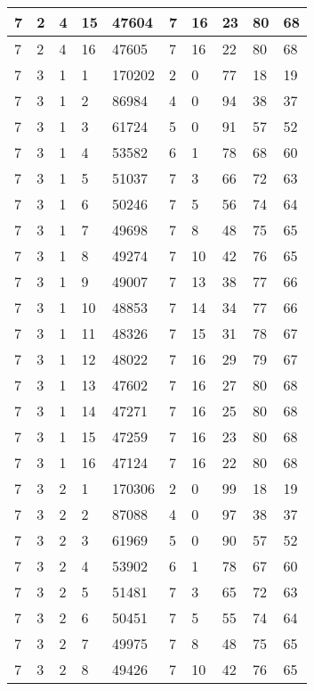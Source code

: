 \begin{table}[!ht]
\begin{tabular}{|l|l|l|l|l|l|l|l|l|l|}
        7 & 2 & 4 & 15 & 47604 & 7 & 16 & 23 & 80 & 68 \\ \hline
        7 & 2 & 4 & 16 & 47605 & 7 & 16 & 22 & 80 & 68 \\ \hline
        7 & 3 & 1 & 1 & 170202 & 2 & 0 & 77 & 18 & 19 \\ \hline
        7 & 3 & 1 & 2 & 86984 & 4 & 0 & 94 & 38 & 37 \\ \hline
        7 & 3 & 1 & 3 & 61724 & 5 & 0 & 91 & 57 & 52 \\ \hline
        7 & 3 & 1 & 4 & 53582 & 6 & 1 & 78 & 68 & 60 \\ \hline
        7 & 3 & 1 & 5 & 51037 & 7 & 3 & 66 & 72 & 63 \\ \hline
        7 & 3 & 1 & 6 & 50246 & 7 & 5 & 56 & 74 & 64 \\ \hline
        7 & 3 & 1 & 7 & 49698 & 7 & 8 & 48 & 75 & 65 \\ \hline
        7 & 3 & 1 & 8 & 49274 & 7 & 10 & 42 & 76 & 65 \\ \hline
        7 & 3 & 1 & 9 & 49007 & 7 & 13 & 38 & 77 & 66 \\ \hline
        7 & 3 & 1 & 10 & 48853 & 7 & 14 & 34 & 77 & 66 \\ \hline
        7 & 3 & 1 & 11 & 48326 & 7 & 15 & 31 & 78 & 67 \\ \hline
        7 & 3 & 1 & 12 & 48022 & 7 & 16 & 29 & 79 & 67 \\ \hline
        7 & 3 & 1 & 13 & 47602 & 7 & 16 & 27 & 80 & 68 \\ \hline
        7 & 3 & 1 & 14 & 47271 & 7 & 16 & 25 & 80 & 68 \\ \hline
        7 & 3 & 1 & 15 & 47259 & 7 & 16 & 23 & 80 & 68 \\ \hline
        7 & 3 & 1 & 16 & 47124 & 7 & 16 & 22 & 80 & 68 \\ \hline
        7 & 3 & 2 & 1 & 170306 & 2 & 0 & 99 & 18 & 19 \\ \hline
        7 & 3 & 2 & 2 & 87088 & 4 & 0 & 97 & 38 & 37 \\ \hline
        7 & 3 & 2 & 3 & 61969 & 5 & 0 & 90 & 57 & 52 \\ \hline
        7 & 3 & 2 & 4 & 53902 & 6 & 1 & 78 & 67 & 60 \\ \hline
        7 & 3 & 2 & 5 & 51481 & 7 & 3 & 65 & 72 & 63 \\ \hline
        7 & 3 & 2 & 6 & 50451 & 7 & 5 & 55 & 74 & 64 \\ \hline
        7 & 3 & 2 & 7 & 49975 & 7 & 8 & 48 & 75 & 65 \\ \hline
        7 & 3 & 2 & 8 & 49426 & 7 & 10 & 42 & 76 & 65 \\ \hline

\end{tabular}
\end{table}
